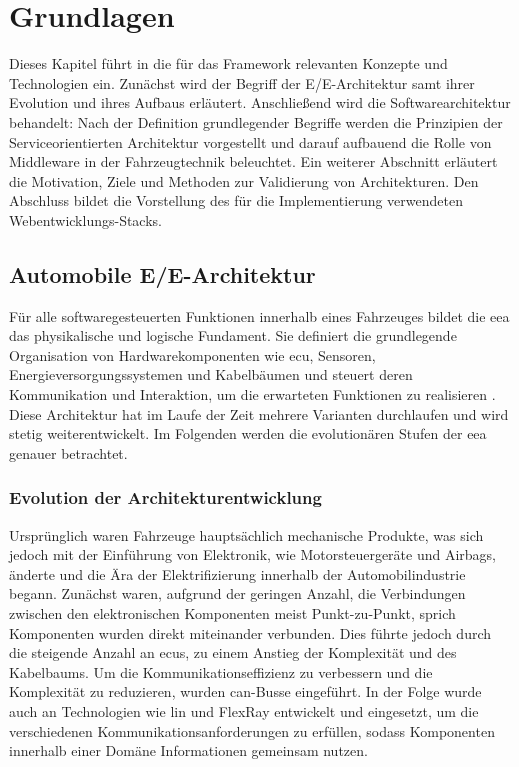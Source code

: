 \chapter{Grundlagen}
\label{sect:basics}

Dieses Kapitel führt in die für das Framework relevanten Konzepte und Technologien ein. Zunächst wird der Begriff der E/E-Architektur samt ihrer Evolution und ihres Aufbaus erläutert. Anschließend wird die Softwarearchitektur behandelt: Nach der Definition grundlegender Begriffe werden die Prinzipien der Serviceorientierten Architektur vorgestellt und darauf aufbauend die Rolle von Middleware in der Fahrzeugtechnik beleuchtet. Ein weiterer Abschnitt erläutert die Motivation, Ziele und Methoden zur Validierung von Architekturen. Den Abschluss bildet die Vorstellung des für die Implementierung verwendeten Webentwicklungs-Stacks.
\section{Automobile E/E-Architektur}
\label{sect:eearchitecture}

Für alle softwaregesteuerten Funktionen innerhalb eines Fahrzeuges bildet die \gls{eea} das physikalische und logische Fundament. Sie definiert die grundlegende Organisation von Hardwarekomponenten wie \gls{ecu}, Sensoren, Energieversorgungssystemen und Kabelbäumen und steuert deren Kommunikation und Interaktion, um die erwarteten Funktionen zu realisieren \cite{jiang2019vehicle}. Diese Architektur hat im Laufe der Zeit mehrere Varianten durchlaufen und wird stetig weiterentwickelt. Im Folgenden werden die evolutionären Stufen der \gls{eea} genauer betrachtet.

\subsection*{Evolution der Architekturentwicklung}

Ursprünglich waren Fahrzeuge hauptsächlich mechanische Produkte, was sich jedoch mit der Einführung von Elektronik, wie Motorsteuergeräte und Airbags, änderte und die Ära der Elektrifizierung innerhalb der Automobilindustrie begann. Zunächst waren, aufgrund der geringen Anzahl, die Verbindungen zwischen den elektronischen Komponenten meist Punkt-zu-Punkt, sprich Komponenten wurden direkt miteinander verbunden. Dies führte jedoch durch die steigende Anzahl an \glspl{ecu}, zu einem Anstieg der Komplexität und des Kabelbaums. Um die Kommunikationseffizienz zu verbessern und die Komplexität zu reduzieren, wurden \gls{can}-Busse eingeführt. In der Folge wurde auch an Technologien wie \gls{lin} und FlexRay entwickelt und eingesetzt, um die verschiedenen Kommunikationsanforderungen zu erfüllen, sodass Komponenten innerhalb einer Domäne Informationen gemeinsam nutzen.

